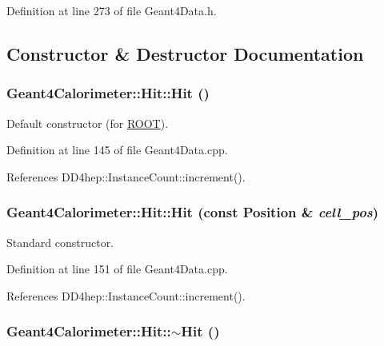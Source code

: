 Definition at line 273 of file Geant4Data.h.

\subsection{Constructor \& Destructor Documentation}
\hypertarget{class_d_d4hep_1_1_simulation_1_1_geant4_calorimeter_1_1_hit_aa82fe18c0b10841fcba68e73c2efd0b0}{
\subsubsection[{Hit}]{\setlength{\rightskip}{0pt plus 5cm}Geant4Calorimeter::Hit::Hit ()}}
\label{class_d_d4hep_1_1_simulation_1_1_geant4_calorimeter_1_1_hit_aa82fe18c0b10841fcba68e73c2efd0b0}


Default constructor (for \hyperlink{namespace_r_o_o_t}{ROOT}). 

Definition at line 145 of file Geant4Data.cpp.

References DD4hep::InstanceCount::increment().\hypertarget{class_d_d4hep_1_1_simulation_1_1_geant4_calorimeter_1_1_hit_ac32b075818d49af9ee0a119877c68980}{
\subsubsection[{Hit}]{\setlength{\rightskip}{0pt plus 5cm}Geant4Calorimeter::Hit::Hit (const {\bf Position} \& {\em cell\_\-pos})}}
\label{class_d_d4hep_1_1_simulation_1_1_geant4_calorimeter_1_1_hit_ac32b075818d49af9ee0a119877c68980}


Standard constructor. 

Definition at line 151 of file Geant4Data.cpp.

References DD4hep::InstanceCount::increment().\hypertarget{class_d_d4hep_1_1_simulation_1_1_geant4_calorimeter_1_1_hit_a57de79fef476cc5fb8564e1b712d0aad}{
\subsubsection[{$\sim$Hit}]{\setlength{\rightskip}{0pt plus 5cm}Geant4Calorimeter::Hit::$\sim$Hit ()}}
\label{class_d_d4hep_1_1_simulation_1_1_geant4_calorimeter_1_1_hit_a57de79fef476cc5fb8564e1b712d0aad}


